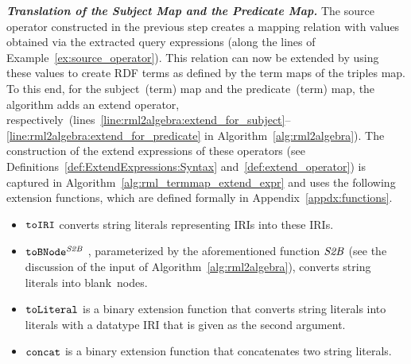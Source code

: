 \noindent\textbf{\itshape Translation of the Subject Map and the Predicate Map.}
The source operator constructed
in the previous step creates a mapping relation with values obtained via the extracted query expressions (along the lines of Example~\ref{ex:source_operator}).
	This relation can now be extended by using these values
to create RDF terms as defined by the term maps of the triples map. To this end, for the
	subject~(term) map and the predicate~(term)
map, the algorithm adds an extend operator, respectively~(lines~\ref{line:rml2algebra:extend_for_subject}--\ref{line:rml2algebra:extend_for_predicate} in Algorithm~\ref{alg:rml2algebra}). The construction of the extend expressions of these operators
	(see Definitions~\ref{def:ExtendExpressions:Syntax} and~\ref{def:extend_operator})
is captured in Algorithm~\ref{alg:rml_termmap_extend_expr} and uses the following extension functions, which are defined formally in Appendix~\ref{appdx:functions}.
%
\vspace{-2mm} %
%
\begin{itemize}
	\item
	$\texttt{toIRI}$
	converts string literals representing IRIs into these IRIs. 

	\item
	$\texttt{toBNode}^{\mathit{S2B}}$%
		, parameterized by the aforementioned function $\mathit{S2B}$ (see the discussion of the input of Algorithm~\ref{alg:rml2algebra}), converts string literals into blank~nodes.

	\item
	$\texttt{toLiteral}$ is a binary extension function that converts string literals into literals with a datatype IRI that is given as the second argument.

	\item
	$\texttt{concat}$ is a binary extension function that concatenates two string literals. 
\end{itemize}

